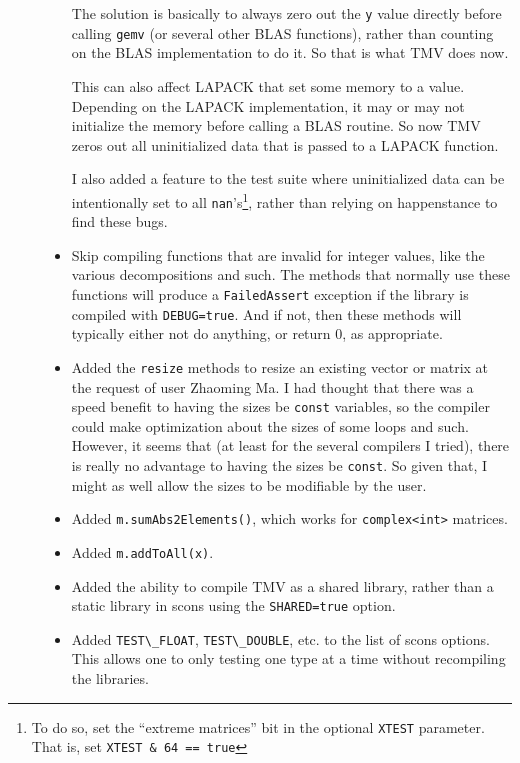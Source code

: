 \documentclass[twoside,letterpaper,11pt]{article}
\renewcommand{\tt}[1]{{\lstinline {#1}}}
\begin{document}
\begin{description}
\begin{itemize}
   The solution is basically to always zero out the \tt{y} value directly
   before calling \tt{gemv} (or several other BLAS functions), rather than counting
   on the BLAS implementation to do it.  So that is what TMV does now.
   
   This can also affect LAPACK that set some memory to a value.
   Depending on the LAPACK implementation, it may or may not initialize the memory before
   calling a BLAS routine.  So now TMV zeros out all uninitialized data that 
   is passed to a LAPACK function.
   
   I also added a feature to the test suite where uninitialized data can be intentionally
   set to all \tt{nan}'s\footnote{To do so, set the ``extreme matrices'' bit in the optional
   \tt{XTEST} parameter.
   That is, set \tt{XTEST & 64 == true}}, 
   rather than relying on happenstance to find these bugs.

\item Skip compiling functions that are invalid for integer values, like the various decompositions 
and such.  The methods that normally use these functions will produce a \tt{FailedAssert}
exception if the library is compiled with \tt{DEBUG=true}.  And if not, then these methods 
will typically either not do anything, or return 0, as appropriate.

\item Added the \tt{resize} methods to resize an existing vector or matrix at the request of user Zhaoming Ma.  I had thought that there was a speed benefit to having the sizes be \tt{const} variables, so the compiler could make optimization about the sizes of some loops and such.  However, it seems that (at least for the several compilers I tried), there is really no advantage to having the sizes be \tt{const}.  So given that, I might as well allow the sizes to be modifiable by the user.

\item Added \tt{m.sumAbs2Elements()}, which works for \tt{complex<int>} matrices.

\item Added \tt{m.addToAll(x)}.

\item Added the ability to compile TMV as a shared library, rather than a static library 
in scons using the \tt{SHARED=true} option.

\item Added \tt{TEST\_FLOAT}, \tt{TEST\_DOUBLE}, etc. to the list of scons options.  
  This allows one to only testing one type at a time without recompiling the libraries.


\end{itemize}
\end{description}
\end{document}
